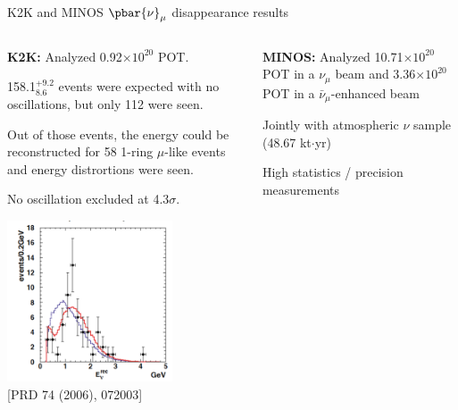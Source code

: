 \begin{frame}[t]{K2K and MINOS $\pbar{\nu}_{\mu}$ disappearance results}

\begin{columns}
  \begin{column}{0.41\textwidth}
    \begin{itemize}
    {\scriptsize
      \item {\bf K2K:} Analyzed 0.92$\times10^{20}$ POT.
      \item 158.1$^{+9.2}_{8.6}$ events were expected with no oscillations, but only 112 were seen.
      \item Out of those events, the energy could be reconstructed for 58 1-ring $\mu$-like events
            and energy distrortions were seen.
      \item No oscillation excluded at 4.3$\sigma$.\\
    }
    \end{itemize}
    {\centering
      \includegraphics[width=0.70\textwidth]{./images/3nu/accelerator/k2k_spectrum.png}\\
      {\scriptsize \color{blue}[PRD 74 (2006), 072003]}\\
    }
  \end{column}
  \begin{column}{0.59\textwidth}
    \begin{itemize}
    {\scriptsize
      \item {\bf MINOS:} Analyzed 10.71$\times10^{20}$ POT in a $\nu_{\mu}$ beam and
            3.36$\times10^{20}$ POT in a $\bar{\nu}_{\mu}$-enhanced beam
      \item Jointly with atmospheric $\nu$ sample (48.67 kt$\cdot$yr)
      \item High statistics / precision measurements\\
}
\end{itemize}
\end{column}
\end{columns}
\end{frame}
